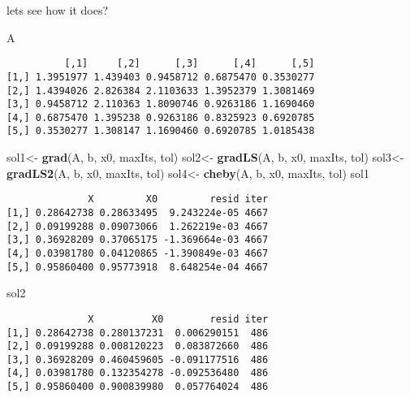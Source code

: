 \documentclass[]{article}
\newenvironment{Shaded}{\begin{snugshade}}{\end{snugshade}}
\newcommand{\KeywordTok}[1]{\textcolor[rgb]{0.13,0.29,0.53}{\textbf{#1}}}
\newcommand{\StringTok}[1]{\textcolor[rgb]{0.31,0.60,0.02}{#1}}
\newcommand{\NormalTok}[1]{#1}
\begin{document}
lets see how it does?

\begin{Shaded}
\begin{Highlighting}[]
\NormalTok{A}
\end{Highlighting}
\end{Shaded}

\begin{verbatim}
          [,1]     [,2]      [,3]      [,4]      [,5]
[1,] 1.3951977 1.439403 0.9458712 0.6875470 0.3530277
[2,] 1.4394026 2.826384 2.1103633 1.3952379 1.3081469
[3,] 0.9458712 2.110363 1.8090746 0.9263186 1.1690460
[4,] 0.6875470 1.395238 0.9263186 0.8325923 0.6920785
[5,] 0.3530277 1.308147 1.1690460 0.6920785 1.0185438
\end{verbatim}

\begin{Shaded}
\begin{Highlighting}[]
\NormalTok{sol1<-}\StringTok{ }\KeywordTok{grad}\NormalTok{(A, b, x0, maxIts, tol)}
\NormalTok{sol2<-}\StringTok{ }\KeywordTok{gradLS}\NormalTok{(A, b, x0, maxIts, tol)}
\NormalTok{sol3<-}\StringTok{ }\KeywordTok{gradLS2}\NormalTok{(A, b, x0, maxIts, tol)}
\NormalTok{sol4<-}\StringTok{ }\KeywordTok{cheby}\NormalTok{(A, b, x0, maxIts, tol)}
\NormalTok{sol1}
\end{Highlighting}
\end{Shaded}

\begin{verbatim}
              X         X0         resid iter
[1,] 0.28642738 0.28633495  9.243224e-05 4667
[2,] 0.09199288 0.09073066  1.262219e-03 4667
[3,] 0.36928209 0.37065175 -1.369664e-03 4667
[4,] 0.03981780 0.04120865 -1.390849e-03 4667
[5,] 0.95860400 0.95773918  8.648254e-04 4667
\end{verbatim}

\begin{Shaded}
\begin{Highlighting}[]
\NormalTok{sol2}
\end{Highlighting}
\end{Shaded}

\begin{verbatim}
              X          X0        resid iter
[1,] 0.28642738 0.280137231  0.006290151  486
[2,] 0.09199288 0.008120223  0.083872660  486
[3,] 0.36928209 0.460459605 -0.091177516  486
[4,] 0.03981780 0.132354278 -0.092536480  486
[5,] 0.95860400 0.900839980  0.057764024  486
\end{verbatim}
\end{document}
